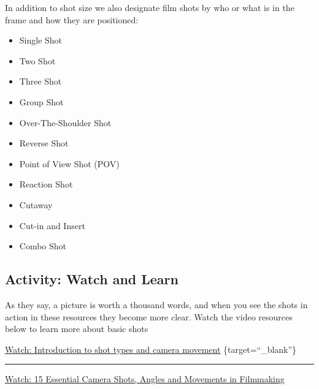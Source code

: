 \documentclass[
]{book}
\providecommand{\tightlist}{%
  \setlength{\itemsep}{0pt}\setlength{\parskip}{0pt}}
\begin{document}
In addition to shot size we also designate film shots by who or what is in the frame and how they are positioned:

\begin{itemize}
\tightlist
\item
  Single Shot\\
\item
  Two Shot\\
\item
  Three Shot\\
\item
  Group Shot\\
\item
  Over-The-Shoulder Shot\\
\item
  Reverse Shot\\
\item
  Point of View Shot (POV)\\
\item
  Reaction Shot\\
\item
  Cutaway\\
\item
  Cut-in and Insert\\
\item
  Combo Shot
\end{itemize}

\hypertarget{activity-watch-and-learn-1}{%
\subsection*{Activity: Watch and Learn}\label{activity-watch-and-learn-1}}

\begin{reflect}
As they say, a picture is worth a thousand words, and when you see the shots in action in these resources they become more clear. Watch the video resources below to learn more about basic shots

\href{https://www.youtube.com/watch?v=lRo2IqYbEaE}{Watch: Introduction to shot types and camera movement}
\{target=``\_blank''\}

\begin{center}\rule{0.5\linewidth}{0.5pt}\end{center}

\href{https://www.youtube.com/watch?v=7y0ouVBcogU}{Watch: 15 Essential Camera Shots, Angles and Movements in Filmmaking}
\end{reflect}
\end{document}
